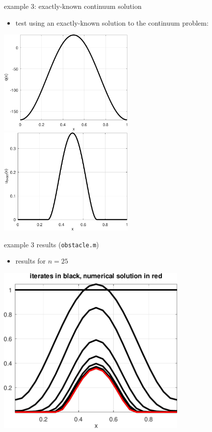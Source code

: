 \documentclass[10pt,hyperref,dvipsnames]{beamer}
\begin{document}
\begin{frame}{example 3: exactly-known continuum solution}

\begin{itemize}
\item test using an exactly-known solution to the continuum problem:
\end{itemize}

\medskip
\noindent
\hspace{-5mm}
\mbox{\includegraphics[width=0.5\textwidth]{figs/qobstacle.pdf} \qquad \includegraphics[width=0.5\textwidth]{figs/uexactobstacle.pdf}}
\end{frame}


\begin{frame}{example 3 results (\texttt{obstacle.m})}

\begin{itemize}
\item results for $n=25$
\end{itemize}

\medskip
\begin{center}
\includegraphics[width=0.7\textwidth]{figs/iteratesobstacle.pdf}
\end{center}
\end{frame}
\end{document}
